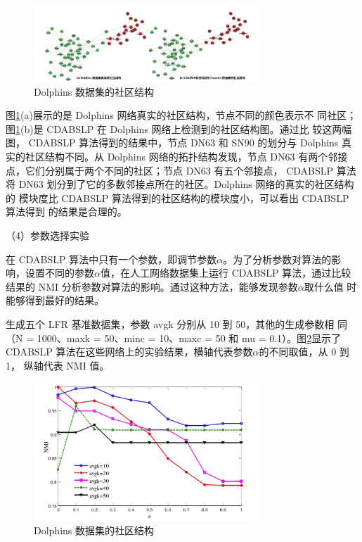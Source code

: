 \begin{figure}
  \centering
  \includegraphics[width=0.75\textwidth]{figures/Dolphins}
  \caption{Dolphins 数据集的社区结构}\label{fig:Dolphins}
\end{figure}

图\ref{fig:Dolphins}(a)展示的是 Dolphins 网络真实的社区结构，节点不同的颜色表示不
同社区；图\ref{fig:Dolphins}(b)是 CDABSLP 在 Dolphins 网络上检测到的社区结构图。通过比
较这两幅图， CDABSLP 算法得到的结果中，节点 DN63 和 SN90 的划分与 Dolphins
真实的社区结构不同。从 Dolphins 网络的拓扑结构发现，节点 DN63 有两个邻接
点，它们分别属于两个不同的社区；节点 DN63 有五个邻接点， CDABSLP 算法将
DN63 划分到了它的多数邻接点所在的社区。Dolphins 网络的真实的社区结构的
模块度比 CDABSLP 算法得到的社区结构的模块度小，可以看出 CDABSLP 算法得到
的结果是合理的。

（4）参数选择实验

在 CDABSLP 算法中只有一个参数，即调节参数$\alpha$。为了分析参数对算法的影
响，设置不同的参数$\alpha$值，在人工网络数据集上运行 CDABSLP 算法，通过比较
结果的 NMI 分析参数对算法的影响。通过这种方法，能够发现参数$\alpha$取什么值
时能够得到最好的结果。

生成五个 LFR 基准数据集，参数 avgk 分别从 10 到 50，其他的生成参数相
同（N = 1000、maxk = 50、minc = 10、maxc = 50 和 mu = 0.1）。图\ref{fig:alpha}显示了
CDABSLP 算法在这些网络上的实验结果，横轴代表参数$\alpha$的不同取值，从 0 到 1，
纵轴代表 NMI 值。

\begin{figure}
  \centering
  \includegraphics[width=0.75\textwidth]{figures/alpha}
  \caption{Dolphins 数据集的社区结构}\label{fig:alpha}
\end{figure}

